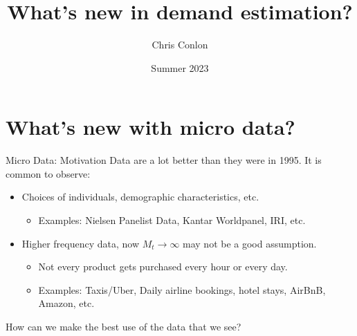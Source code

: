 

\usepackage{lipsum}
\usepackage{amsmath} 
\usepackage{amsthm} 
\usepackage{amssymb} 
\usepackage{mathtools}
\usepackage{dutchcal}


\newcommand{\vect}[1]{\boldsymbol{\mathbf{#1}}}
\newcommand{\pd}[2]{\frac{\partial{#1}}{\partial{#2}}}
\newcommand{\expect}[2]{\mathbb{E}_{#1}\left[{#2}\right]}
\newcommand{\expectsmall}[2]{\mathbb{E}_{#1}{#2}}
\newcommand{\expectsuper}[3]{\mathbb{E}_{#1}^{#2}\left[{#3}\right]}
\newcommand{\ind}[1]{\mathbbm{1}\left\{{#1}\right\}}
\newcommand{\prob}[1]{\mathbb{P}\left\{{#1}\right\}}
\newcommand{\derivative}[2]{\frac{d{#2}}{d{#1}}}
\newcommand{\cat}[1]{\citeasnoun{#1}}

\title{What's new in demand estimation?}
\author{Chris Conlon}

\date{Summer 2023}








\begin{frame}[plain] %
\titlepage
\end{frame}


\section*{What's new with micro data?}

\begin{frame}{Micro Data: Motivation}
Data are a lot better than they were in 1995. It is common to observe:
\begin{itemize}
\item Choices of individuals, demographic characteristics, etc.
\begin{itemize}
\item Examples: Nielsen Panelist Data, Kantar Worldpanel, IRI, etc.
\end{itemize}
\item Higher frequency data, now $M_t \rightarrow \infty$ may not be a good assumption.
\begin{itemize}
    \item Not every product gets purchased every hour or every day.
    \item Examples: Taxis/Uber, Daily airline bookings, hotel stays, AirBnB, Amazon, etc.
\end{itemize}
\end{itemize}
How can we make the best use of the data that we see?
\end{frame}


